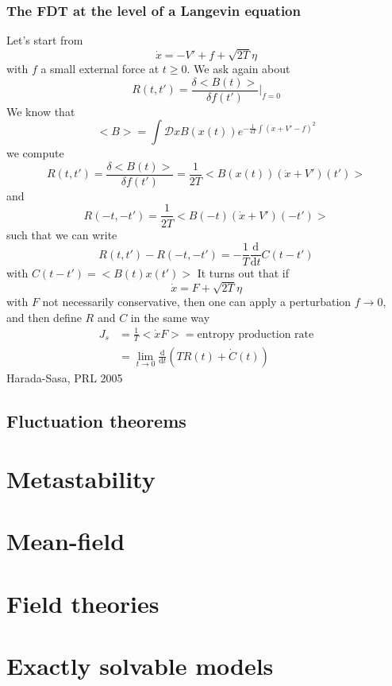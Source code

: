 \documentclass[a4paper]{book}
\theoremstyle{definition}
\theoremstyle{remark}
\begin{document}
\subsection{The FDT at the level of a Langevin equation}
Let's start from 
\begin{equation}
    \dot{x} = -V' + f + \sqrt{2T}\eta 
\end{equation}
with $f$ a small external force at $t \geq 0$. We ask again about 
\begin{equation}
    R(t, t') = \frac{\delta <B(t)>}{\delta f(t')}\Bigg| _{f=0}
\end{equation}
We know that 
\begin{equation}
    <B> = \int \mathcal{D}x B(x(t)) e^{-\frac{1}{4T}\int (\dot{x} + V' - f)^2}
\end{equation}
we compute 
\begin{equation}
    R(t, t') = \frac{\delta<B(t)>}{\delta f(t')} = \frac{1}{2T}<B(x(t))(\dot{x}+V')(t')>
\end{equation}
and
\begin{equation}
    R(-t, -t') = \frac{1}{2T}<B(-t)(\dot{x} + V')(-t')>
\end{equation}
such that we can write
\begin{equation}
    R(t, t') - R(-t, -t') = -\frac{1}{T}\frac{\text{d}}{\text{d}t} C(t-t')
\end{equation}
with $C(t-t') = <B(t)x(t')>$
It turns out that if 
\begin{equation}
    \dot{x} = F + \sqrt{2T}\eta
\end{equation}
with $F$ not necessarily conservative, then one can apply a perturbation $f\rightarrow 0$, and then define $R$ and $C$ in the same way 
\begin{equation}
    \begin{aligned}
        J_s &= \frac{1}{T}<\dot{x} F> = \text{entropy production rate} \\ 
        &= \lim_{t \rightarrow 0} \frac{\text{d}}{\text{d}t} (TR(t) + \dot{C}(t))
    \end{aligned}
\end{equation}
Harada-Sasa, PRL 2005

\section{Fluctuation theorems}

\chapter{Metastability}

\chapter{Mean-field}

\chapter{Field theories}

\chapter{Exactly solvable models}
\end{document}
